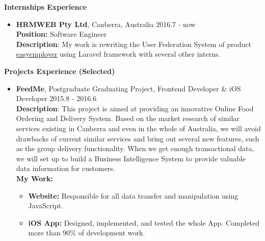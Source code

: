 \documentclass{res}
\newcommand{\resheading}[1]{{\normalsize \colorbox{mygrey}{\begin{minipage}{\textwidth}{\textbf{#1 \vphantom{p\^{E}}}}\end{minipage}}}}
\begin{document}
\begin{resume}
\begin{CJK*}{UTF8}{song}
\resheading{Internships Experience}
\begin{itemize}
\itemsep -2pt %
	\item {\bf HRMWEB Pty Ltd}, Canberra, Australia \hfill 2016.7 - now	\vspace{3pt} \\	
\textbf{Position:} Software Engineer \vspace{2pt} \\
\textbf{Description}: My work is rewriting the User Federation System of product \href{http://www.easyemployer.com.au/}{easyemployer} using Laravel framework with several other interns. \vspace{2pt}
\end{itemize}

\resheading{Projects Experience (Selected)}
\begin{itemize}
	\item {\bf FeedMe}, Postgraduate Graduating Project, Frontend Developer $\&$ iOS Developer \hfill 2015.8 - 2016.6	\vspace{3pt} \\	
\textbf{Description}: This project is aimed at providing an innovative Online Food Ordering and Delivery System. Based on the market research of similar services existing in Canberra and even in the whole of Australia, we will avoid drawbacks of current similar services and bring out several new features, such as the group delivery functionality. When we get enough transactional data, we will set up to build a Business Intelligence System to provide valuable data information for customers. \vspace{2pt} \\
\textbf{My Work:}
	\begin{itemize}
		\item {\bf Website:} Responsible for all data transfer and manipulation using JavaScript.
		\item {\bf iOS App:} Designed, implemented, and tested the whole App. Completed more than $90\%$ of development work.
	\end{itemize}	
\end{itemize}




\end{CJK*}
\end{resume}
\end{document}
